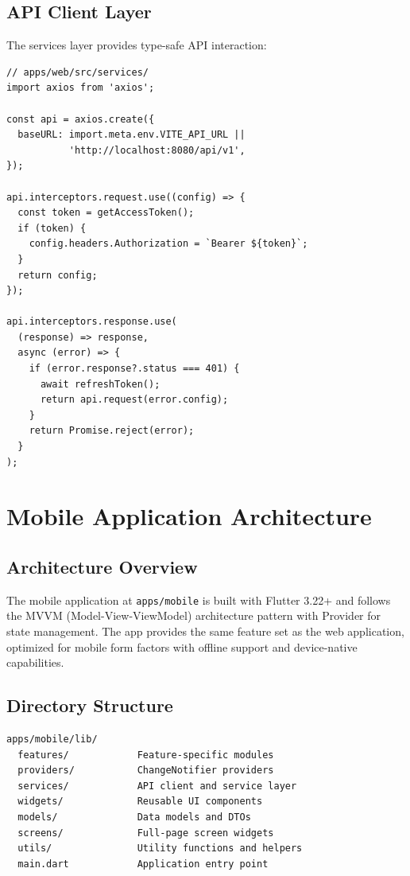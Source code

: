 \documentclass[11pt,a4paper]{article}
\begin{document}
\subsection{API Client Layer}

The services layer provides type-safe API interaction:

\begin{lstlisting}[language={[Sharp]C}, caption=API Client Structure]
// apps/web/src/services/
import axios from 'axios';

const api = axios.create({
  baseURL: import.meta.env.VITE_API_URL ||
           'http://localhost:8080/api/v1',
});

api.interceptors.request.use((config) => {
  const token = getAccessToken();
  if (token) {
    config.headers.Authorization = `Bearer ${token}`;
  }
  return config;
});

api.interceptors.response.use(
  (response) => response,
  async (error) => {
    if (error.response?.status === 401) {
      await refreshToken();
      return api.request(error.config);
    }
    return Promise.reject(error);
  }
);
\end{lstlisting}

\clearpage

\section{Mobile Application Architecture}

\subsection{Architecture Overview}

The mobile application at \texttt{apps/mobile} is built with Flutter 3.22+ and follows the MVVM (Model-View-ViewModel) architecture pattern with Provider for state management. The app provides the same feature set as the web application, optimized for mobile form factors with offline support and device-native capabilities.

\subsection{Directory Structure}

\begin{verbatim}
apps/mobile/lib/
  features/            Feature-specific modules
  providers/           ChangeNotifier providers
  services/            API client and service layer
  widgets/             Reusable UI components
  models/              Data models and DTOs
  screens/             Full-page screen widgets
  utils/               Utility functions and helpers
  main.dart            Application entry point
\end{verbatim}
\end{document}
